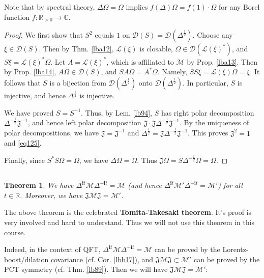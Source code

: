 \documentclass[12pt,b5paper,notitlepage]{article}
\theoremstyle{definition}
\theoremstyle{plain}
\newtheorem{thm}[df]{Theorem}
\newcommand{\fk}{\mathfrak}
\newcommand{\mc}{\mathcal}
\newcommand{\Dom}{\scr{D}}
\newcommand{\scr}{\mathscr}
\newcommand{\im}{\mathbf{i}}
\newcommand{\Cbb}{\mathbb C}
\newcommand{\Rbb}{\mathbb R}
\newcommand{\half}{\frac{1}{2}}
\numberwithin{equation}{section}
\begin{document}
Note that by spectral theory, $\Delta\Omega=\Omega$ implies $f(\Delta)\Omega=f(1)\cdot\Omega$ for any Borel function $f:\Rbb_{>0}\rightarrow\Cbb$.




\begin{proof}
We first show that $S^2$ equals $1$ on $\Dom(S)=\Dom(\Delta^{\frac 12})$. Choose any $\xi\in\Dom(S)$. Then by Thm. \ref{lba12}, $\scr L(\xi)$ is closable, $\Omega\in\Dom(\scr L(\xi)^*)$, and $S\xi=\scr L(\xi)^*\Omega$. Let $A=\scr L(\xi)^*$, which is affiliated to $\mc M$ by Prop. \ref{lba13}.	Then by Prop. \ref{lba14}, $A\Omega\in\Dom(S)$, and $SA\Omega=A^*\Omega$. Namely, $SS\xi=\scr L(\xi)\Omega=\xi$. It follows that $S$ is a bijection from $\Dom(\Delta^{\frac 12})$ onto $\Dom(\Delta^{\frac 12})$. In particular, $S$ is injective, and hence $\Delta^{\frac 12}$ is injective.


We have proved $S=S^{-1}$. Thus, by Lem. \ref{lb94}, $S$ has right polar decomposition $\Delta^{-\half}\fk J^{-1}$, and hence left polar decomposition $\fk J\cdot \fk J\Delta^{-\frac 12}\fk J^{-1}$. By the uniqueness of polar decompositions, we have $\fk J=\fk J^{-1}$ and $\Delta^{\frac 12}=\fk J\Delta^{-\frac 12}\fk J^{-1}$. This proves $\fk J^2=1$ and \eqref{eq125}.

Finally, since $S^*S\Omega=\Omega$, we have $\Delta\Omega=\Omega$. Thus $\fk J\Omega=S\Delta^{-\half}\Omega=\Omega$.
\end{proof}










\subsection{}




\begin{thm}
We have $\Delta^{\im t}\mc M\Delta^{-\im t}=\mc M$ (and hence $\Delta^{\im t}\mc M'\Delta^{-\im t}=\mc M'$) for all $t\in\Rbb$. Moreover, we have $\fk J\mc M\fk J=\mc M'$.
\end{thm}

The above theorem is the celebrated \textbf{Tomita-Takesaki theorem}. It's proof is very involved and hard to understand. Thus we will not use this theorem in this course. 

Indeed, in the context of QFT, $\Delta^{\im t}\mc M\Delta^{-\im t}=\mc M$ can be proved by the Lorentz-boost/dilation covariance (cf. Cor. \ref{lbb17}), and $\fk J\mc M\fk J\subset\mc M'$ can be proved by the PCT symmetry (cf. Thm. \ref{lb89}). Then we will have $\fk J\mc M\fk J=\mc M'$:
\end{document}
